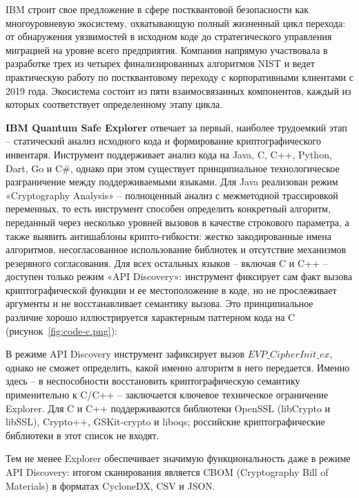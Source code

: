 \documentclass{itmo-vkr}
\begin{document}
	IBM строит свое предложение в сфере постквантовой безопасности как многоуровневую экосистему, охватывающую полный жизненный цикл перехода: от обнаружения уязвимостей в исходном коде до стратегического управления миграцией на уровне всего предприятия. Компания напрямую участвовала в разработке трех из четырех финализированных алгоритмов NIST и ведет практическую работу по постквантовому переходу с корпоративными клиентами с 2019 года. Экосистема состоит из пяти взаимосвязанных компонентов, каждый из которых соответствует определенному этапу цикла.
	
	\textbf{IBM Quantum Safe Explorer} отвечает за первый, наиболее трудоемкий этап -- статический анализ исходного кода и формирование криптографического инвентаря. Инструмент поддерживает анализ кода на Java, C, C++, Python, Dart, Go и C\#, однако при этом существует принципиальное технологическое разграничение между поддерживаемыми языками. Для Java реализован режим «Cryptography Analysis» -- полноценный анализ с межметодной трассировкой переменных, то есть инструмент способен определить конкретный алгоритм, переданный через несколько уровней вызовов в качестве строкового параметра, а также выявить антишаблоны крипто-гибкости: жестко закодированные имена алгоритмов, несогласованное использование библиотек и отсутствие механизмов резервного согласования. Для всех остальных языков -- включая C и C++ -- доступен только режим «API Discovery»: инструмент фиксирует сам факт вызова криптографической функции и ее местоположение в коде, но не прослеживает аргументы и не восстанавливает семантику вызова. Это принципиальное различие хорошо иллюстрируется характерным паттерном кода на C (рисунок~\ref{fig:code-c.png}):


	В режиме API Discovery инструмент зафиксирует вызов $EVP\_CipherInit\_ex$, однако не сможет определить, какой именно алгоритм в него передается. Именно здесь -- в неспособности восстановить криптографическую семантику применительно к C/C++ -- заключается ключевое техническое ограничение Explorer. Для C и C++ поддерживаются библиотеки OpenSSL (libCrypto и libSSL), Crypto++, GSKit-crypto и liboqs; российские криптографические библиотеки в этот список не входят.
	
	Тем не менее Explorer обеспечивает значимую функциональность даже в режиме API Discovery: итогом сканирования является CBOM (Cryptography Bill of Materials) в форматах CycloneDX, CSV и JSON. 
	
\end{document}
